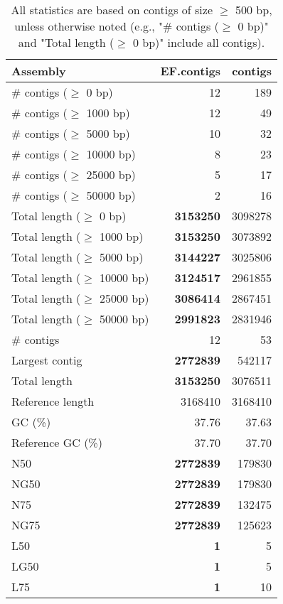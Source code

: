 \documentclass[12pt,a4paper]{article}
\begin{document}
\begin{table}[ht]
\begin{center}
\caption{All statistics are based on contigs of size $\geq$ 500 bp, unless otherwise noted (e.g., "\# contigs ($\geq$ 0 bp)" and "Total length ($\geq$ 0 bp)" include all contigs).}
\begin{tabular}{|l*{2}{|r}|}
\hline
Assembly & EF.contigs & contigs \\ \hline
\# contigs ($\geq$ 0 bp) & 12 & 189 \\ \hline
\# contigs ($\geq$ 1000 bp) & 12 & 49 \\ \hline
\# contigs ($\geq$ 5000 bp) & 10 & 32 \\ \hline
\# contigs ($\geq$ 10000 bp) & 8 & 23 \\ \hline
\# contigs ($\geq$ 25000 bp) & 5 & 17 \\ \hline
\# contigs ($\geq$ 50000 bp) & 2 & 16 \\ \hline
Total length ($\geq$ 0 bp) & {\bf 3153250} & 3098278 \\ \hline
Total length ($\geq$ 1000 bp) & {\bf 3153250} & 3073892 \\ \hline
Total length ($\geq$ 5000 bp) & {\bf 3144227} & 3025806 \\ \hline
Total length ($\geq$ 10000 bp) & {\bf 3124517} & 2961855 \\ \hline
Total length ($\geq$ 25000 bp) & {\bf 3086414} & 2867451 \\ \hline
Total length ($\geq$ 50000 bp) & {\bf 2991823} & 2831946 \\ \hline
\# contigs & 12 & 53 \\ \hline
Largest contig & {\bf 2772839} & 542117 \\ \hline
Total length & {\bf 3153250} & 3076511 \\ \hline
Reference length & 3168410 & 3168410 \\ \hline
GC (\%) & 37.76 & 37.63 \\ \hline
Reference GC (\%) & 37.70 & 37.70 \\ \hline
N50 & {\bf 2772839} & 179830 \\ \hline
NG50 & {\bf 2772839} & 179830 \\ \hline
N75 & {\bf 2772839} & 132475 \\ \hline
NG75 & {\bf 2772839} & 125623 \\ \hline
L50 & {\bf 1} & 5 \\ \hline
LG50 & {\bf 1} & 5 \\ \hline
L75 & {\bf 1} & 10 \\ \hline

\end{tabular}
\end{center}
\end{table}
\end{document}
